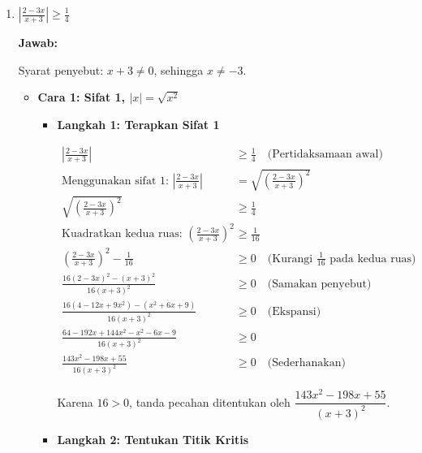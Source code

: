 \documentclass[10pt,a4paper]{article}
\newcounter{eqblock}
\newcommand{\reseteq}{%
  \stepcounter{eqblock}%
  \setcounter{equation}{0}%
  \renewcommand{\theHequation}{\arabic{eqblock}.\arabic{equation}}%
}
\begin{document}
\begin{enumerate}
\begin{itemize}
\begin{itemize}
\begin{center}
\begin{tikzpicture}[scale=0.8]
\end{tikzpicture}
\end{center}

\item \textbf{Langkah 5: Tentukan HP}

$\text{HP} = (-\infty, 0] \cup [2, \infty)$

\end{itemize}
\end{itemize}

\item $\displaystyle \left|\frac{2-3x}{x+3}\right| \geq \frac{1}{4}$

\textbf{Jawab:}

Syarat penyebut: $x + 3 \neq 0$, sehingga $x \neq -3$.

\begin{itemize}
\item \textbf{Cara 1: Sifat 1, $|x| = \sqrt{x^2}$}

\begin{itemize}
\item \textbf{Langkah 1: Terapkan Sifat 1}

\reseteq
\begin{align}
\left|\frac{2-3x}{x+3}\right| &\geq \frac{1}{4} \quad \text{(Pertidaksamaan awal)} \\
\text{Menggunakan sifat 1: } \left|\frac{2-3x}{x+3}\right| &= \sqrt{\left(\frac{2-3x}{x+3}\right)^2} \\
\sqrt{\left(\frac{2-3x}{x+3}\right)^2} &\geq \frac{1}{4} \\
\text{Kuadratkan kedua ruas: } \left(\frac{2-3x}{x+3}\right)^2 &\geq \frac{1}{16} \\
\left(\frac{2-3x}{x+3}\right)^2 - \frac{1}{16} &\geq 0 \quad \text{(Kurangi $\frac{1}{16}$ pada kedua ruas)} \\
\frac{16(2-3x)^2 - (x+3)^2}{16(x+3)^2} &\geq 0 \quad \text{(Samakan penyebut)} \\
\frac{16(4-12x+9x^2) - (x^2+6x+9)}{16(x+3)^2} &\geq 0 \quad \text{(Ekspansi)} \\
\frac{64-192x+144x^2-x^2-6x-9}{16(x+3)^2} &\geq 0 \\
\frac{143x^2-198x+55}{16(x+3)^2} &\geq 0 \quad \text{(Sederhanakan)}
\end{align}

Karena $16 > 0$, tanda pecahan ditentukan oleh $\dfrac{143x^2-198x+55}{(x+3)^2}$.

\item \textbf{Langkah 2: Tentukan Titik Kritis}


\end{itemize}
\end{itemize}
\end{enumerate}
\end{document}
